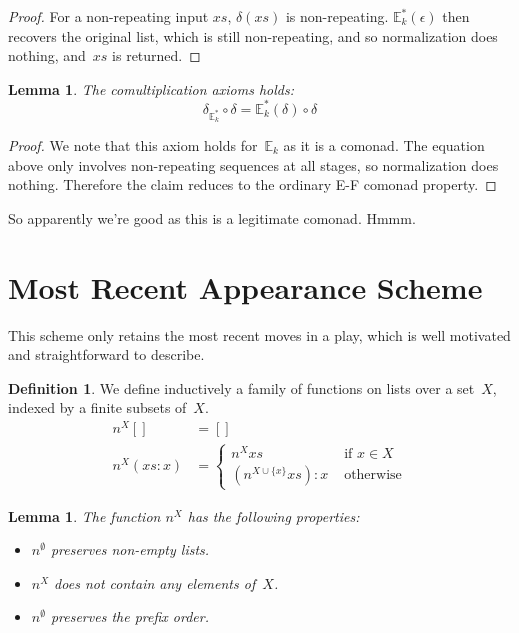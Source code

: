 \documentclass{article}
\theoremstyle{plain}
\newtheorem{lemma}[theorem]{Lemma}
\theoremstyle{definition}
\newtheorem{definition}[theorem]{Definition}
\theoremstyle{remark}
\numberwithin{theorem}{section}
\begin{document}
\begin{proof}
For a non-repeating input $xs$, $\delta(xs)$ is non-repeating. $\mathbb{E}^*_k(\epsilon)$ then recovers the original list, which is still non-repeating, and so normalization does nothing, and~$xs$ is returned.
\end{proof}
\begin{lemma}
The comultiplication axioms holds:
\begin{equation*}
    \delta_{\mathbb{E}^*_k} \circ \delta = \mathbb{E}^*_k(\delta) \circ \delta
\end{equation*}
\end{lemma}
\begin{proof}
We note that this axiom holds for~$\mathbb{E}_k$ as it is a comonad. The equation above only involves non-repeating sequences at all stages, so normalization does nothing. Therefore the claim reduces to the ordinary E-F comonad property.
\end{proof}
So apparently we're good as this is a legitimate comonad. Hmmm.

\section{Most Recent Appearance Scheme}
This scheme only retains the most recent moves in a play, which is well motivated and straightforward to describe.
\begin{definition}
We define inductively a family of functions on lists over a set~$X$, indexed by a finite subsets of~$X$.
\begin{align*}
    n^X [] &= []\\
    n^X (xs:x) &= 
    \begin{cases}
    n^X xs &\mbox{ if } x \in X\\
    (n^{X \cup \{ x \} }xs) : x &\mbox{ otherwise}
    \end{cases}
\end{align*}
\end{definition}
\begin{lemma}
The function $n^X$ has the following properties:
\begin{itemize}
    \item $n^\emptyset$ preserves non-empty lists.
    \item $n^X$ does not contain any elements of~$X$.
    \item $n^\emptyset$ preserves the prefix order.
\end{itemize}
\end{lemma}
\end{document}
